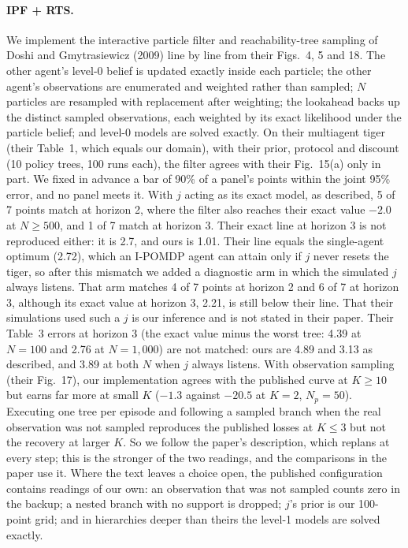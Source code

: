 \documentclass{article}
\begin{document}
\paragraph{IPF + RTS.}\label{sec:fidelity-ipf} We implement the interactive particle filter and reachability-tree sampling of Doshi and Gmytrasiewicz (2009) line by line from their Figs.~4, 5 and 18. The other agent's level-0 belief is updated exactly inside each particle; the other agent's observations are enumerated and weighted rather than sampled; $N$ particles are resampled with replacement after weighting; the lookahead backs up the distinct sampled observations, each weighted by its exact likelihood under the particle belief; and level-0 models are solved exactly. On their multiagent tiger (their Table~1, which equals our domain), with their prior, protocol and discount (10 policy trees, 100 runs each), the filter agrees with their Fig.~15(a) only in part. We fixed in advance a bar of 90\% of a panel's points within the joint 95\% error, and no panel meets it. With $j$ acting as its exact model, as described, 5 of 7 points match at horizon 2, where the filter also reaches their exact value $-2.0$ at $N \geq 500$, and 1 of 7 match at horizon 3. Their exact line at horizon 3 is not reproduced either: it is 2.7, and ours is 1.01. Their line equals the single-agent optimum (2.72), which an I-POMDP agent can attain only if $j$ never resets the tiger, so after this mismatch we added a diagnostic arm in which the simulated $j$ always listens. That arm matches 4 of 7 points at horizon 2 and 6 of 7 at horizon 3, although its exact value at horizon 3, 2.21, is still below their line. That their simulations used such a $j$ is our inference and is not stated in their paper. Their Table~3 errors at horizon 3 (the exact value minus the worst tree: 4.39 at $N = 100$ and 2.76 at $N = 1{,}000$) are not matched: ours are 4.89 and 3.13 as described, and 3.89 at both $N$ when $j$ always listens. With observation sampling (their Fig.~17), our implementation agrees with the published curve at $K \geq 10$ but earns far more at small $K$ ($-1.3$ against $-20.5$ at $K = 2$, $N_p = 50$). Executing one tree per episode and following a sampled branch when the real observation was not sampled reproduces the published losses at $K \leq 3$ but not the recovery at larger $K$. So we follow the paper's description, which replans at every step; this is the stronger of the two readings, and the comparisons in the paper use it. Where the text leaves a choice open, the published configuration contains readings of our own: an observation that was not sampled counts zero in the backup; a nested branch with no support is dropped; $j$'s prior is our 100-point grid; and in hierarchies deeper than theirs the level-1 models are solved exactly.
\end{document}
